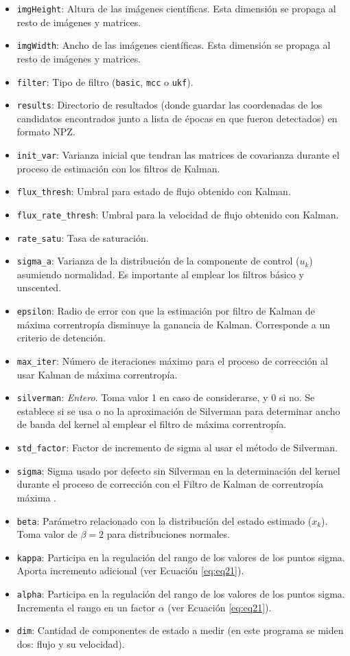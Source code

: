 \begin{itemize}
\item \texttt{imgHeight}: Altura de las im\'agenes cient\'ificas. Esta dimensi\'on se propaga al resto de im\'agenes y matrices.
\item \texttt{imgWidth}: Ancho de las im\'agenes cient\'ificas. Esta dimensi\'on se propaga al resto de im\'agenes y matrices.
\item \texttt{filter}: Tipo de filtro (\texttt{basic}, \texttt{mcc} o \texttt{ukf}).
\item \texttt{results}: Directorio de resultados (donde guardar las coordenadas de los candidatos encontrados junto a lista de \'epocas en que fueron detectados) en formato NPZ.
\item \texttt{init\_var}: Varianza inicial que tendran las matrices de covarianza durante el proceso de estimaci\'on con los filtros de Kalman. 
\item \texttt{flux\_thresh}: Umbral para estado de flujo obtenido con Kalman. 
\item \texttt{flux\_rate\_thresh}: Umbral para la velocidad de flujo obtenido con Kalman.
\item \texttt{rate\_satu}: Tasa de saturaci\'on.
\item \texttt{sigma\_a}: Varianza de la distribuci\'on de la componente de control ($u_k$) asumiendo normalidad. Es importante al emplear los filtros b\'asico y unscented.
\item \texttt{epsilon}: Radio de error con que la estimaci\'on por filtro de Kalman de m\'axima correntrop\'ia disminuye la ganancia de Kalman. Corresponde a un criterio de detenci\'on.
\item \texttt{max\_iter}: N\'umero de iteraciones m\'aximo para el proceso de correcci\'on al usar Kalman de m\'axima correntrop\'ia. 
\item \texttt{silverman}: \textit{Entero}. Toma valor 1 en caso de considerarse, y 0 si no. Se establece si se usa o no la aproximaci\'on de Silverman para determinar ancho de banda del kernel al emplear el filtro de m\'axima correntrop\'ia.
\item \texttt{std\_factor}: Factor de incremento de sigma al usar el m\'etodo de Silverman.
\item \texttt{sigma}: Sigma usado por defecto sin Silverman en la determinaci\'on del kernel durante el proceso de correcci\'on con el Filtro de Kalman de correntrop\'ia m\'axima .
\item \texttt{beta}: Par\'ametro relacionado con la distribuci\'on del estado estimado ($x_k$). Toma valor de $\beta = 2$ para distribuciones normales.
\item \texttt{kappa}: Participa en la regulaci\'on del rango de los valores de los puntos sigma. Aporta incremento adicional (ver Ecuaci\'on \ref{eq:eq21}).
\item \texttt{alpha}: Participa en la regulaci\'on del rango de los valores de los puntos sigma. Incrementa el rango en un factor $\alpha$ (ver Ecuaci\'on \ref{eq:eq21}).
\item \texttt{dim}: Cantidad de componentes de estado a medir (en este programa se miden dos: flujo y su velocidad).
\end{itemize}

